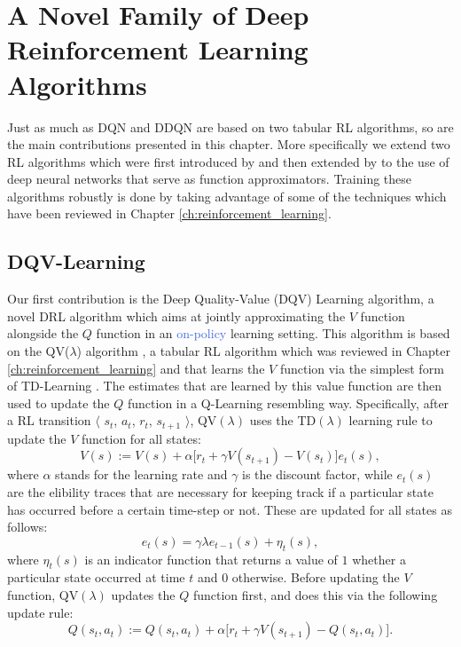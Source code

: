 \section{A Novel Family of Deep Reinforcement Learning Algorithms}
\label{sec:dqv_family}

Just as much as DQN and DDQN are based on two tabular RL algorithms, so are the main contributions presented in this chapter. More specifically we extend two RL algorithms which were first introduced by \citet{wiering2005qv} and then extended by \citet{wiering2009qv} to the use of deep neural networks that serve as function approximators. Training these algorithms robustly is done by taking advantage of some of the techniques which have been reviewed in Chapter \ref{ch:reinforcement_learning}.

\subsection{DQV-Learning}
Our first contribution is the Deep Quality-Value (DQV) Learning algorithm, a novel DRL algorithm which aims at jointly approximating the $V$ function alongside the $Q$ function in an \textcolor{RoyalBlue}{on-policy} learning setting. This algorithm is based on the QV($\lambda$) algorithm \cite{wiering2005qv}, a tabular RL algorithm which was reviewed in Chapter \ref{ch:reinforcement_learning} and that learns the $V$ function via the simplest form of TD-Learning \cite{sutton1988learning}. The estimates that are learned by this value function are then used to update the $Q$ function in a Q-Learning resembling way. Specifically, after a RL transition $\langle$ $s_{t}$, $a_{t}$, $r_{t}$, $s_{t+1}$ $\rangle$, QV$(\lambda)$ uses the TD$(\lambda)$ learning rule \cite{sutton1988learning} to update the $V$ function for all states: 
\begin{equation}
V(s):= V(s) + \alpha \big[ r_{t} + \gamma V(s_{t+1}) - V(s_t) \big] e_{t}(s),
\label{eq:qv_lambda_v_update}
\end{equation}
where $\alpha$ stands for the learning rate and $\gamma$ is the discount factor, while $e_t(s)$ are the elibility traces \cite{peng1994incremental, wiering1998speeding, geist2014off} that are necessary for keeping track if a particular state has occurred before a certain time-step or not. These are updated for all states as follows:  
\begin{equation} 
e_{t}(s) = \gamma \lambda e_{t-1}(s) + \eta_t(s),
\end{equation}
where $\eta_t(s)$ is an indicator function that returns a value of $1$ whether a particular state occurred at time $t$ and $0$ otherwise. Before updating the $V$ function, QV$(\lambda)$ updates the $Q$ function first, and does this via the following update rule:
\begin{equation}
Q(s_{t}, a_{t}):= Q(s_{t}, a_{t}) + \alpha \big[r_{t} + \gamma V(s_{t+1}) - Q(s_{t}, a_{t}) \big].
\label{eq:qv_lambda_q_update}
\end{equation}

